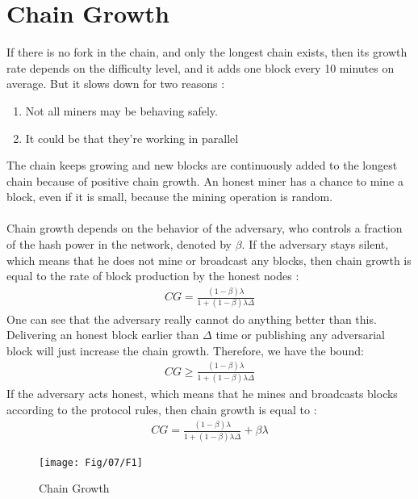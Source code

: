 \section{Chain Growth}
If there is no fork in the chain, and only the longest chain exists, then its growth rate depends on the difficulty level, and it adds one block every 10 minutes on average.  But it slows down for two reasons :
\begin{enumerate}
	\item Not all miners may be behaving safely.
	\item It could be that they're working in parallel
\end{enumerate}
The chain keeps growing and new blocks are continuously added to the longest chain because of positive chain growth. An honest miner has a chance to mine a block, even if it is small, because the mining operation is random.\\\\
Chain growth depends on the behavior of the adversary, who controls a fraction of the hash power in the network, denoted by $\beta$. If the adversary stays silent, which means that he does not mine or broadcast any blocks, then chain growth is equal to the rate of block production by the honest nodes :
\begin{align*}
	CG=\frac{(1-\beta)\lambda}{1+(1-\beta)\lambda\Delta}
\end{align*}
One can see that the adversary really cannot do anything better than this. Delivering an honest block earlier than $\Delta$ time or publishing any adversarial block will just increase the chain growth. Therefore, we have the bound:
\begin{align}
	CG\ge \frac{(1-\beta)\lambda}{1+(1-\beta)\lambda\Delta}
	\label{eq1}
\end{align}
If the adversary acts honest, which means that he mines and broadcasts blocks according to the protocol rules, then chain growth is equal to :
\begin{align*}
	CG=\frac{(1-\beta)\lambda}{1+(1-\beta)\lambda\Delta} + \beta\lambda
\end{align*}
\begin{figure}[h!]
	\centering
	\texttt{[image: Fig/07/F1]}
	\caption{Chain Growth}
	\label{fig:l7_f1}
\end{figure}
